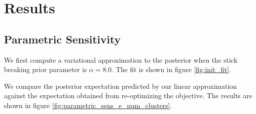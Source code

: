\documentclass[a4paper]{article}
\begin{document}
\section{Results}

\subsection{Parametric Sensitivity}
We first compute a variational approximation to the posterior when the stick breaking
prior parameter is $\alpha = 8.0$. The fit is shown in figure \ref{fig:init_fit}.

We compare the posterior expectation predicted by our linear approximation against the
expectation obtained from re-optimizing the objective. The results are shown in figure
\ref{fig:parametric_sens_e_num_clusters}.
\end{document}
